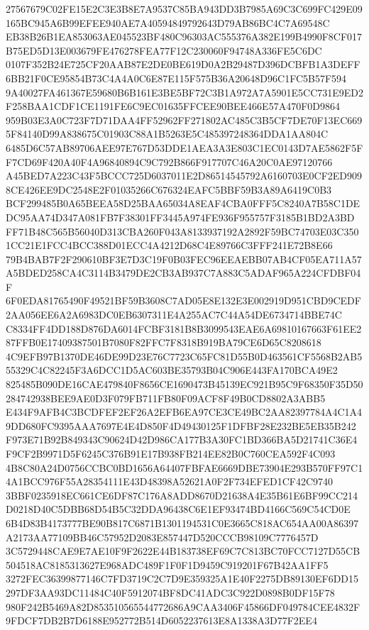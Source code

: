 \documentclass[UTF8,fontset=fandol,zihao=-4,a4paper]{ctexart}
\begin{document}
{{27567679C02FE15E2C3E3B8E7A9537C85BA943DD3B7985A69C3C699FC429E09165BC945A6B99EFEE940AE7A40594849792643D79AB86BC4C7A69548C
EB38B26B1EA853063AE045523BF480C96303AC555376A382E199B4990F8CF017B75ED5D13E003679FE476278FEA77F12C230060F94748A336FE5C6DC
0107F352B24E725CF20AAB87E2DE0BE619D0A2B29487D396DCBFB1A3DEFF6BB21F0CE95854B73C4A4A0C6E87E115F575B36A20648D96C1FC5B57F594
9A40027FA461367E59680B6B161E3BE5BF72C3B1A972A7A5901E5CC731E9ED2F258BAA1CDF1CE1191FE6C9EC01635FFCEE90BEE466E57A470F0D9864
959B03E3A0C723F7D71DAA4FF52962FF271802AC485C3B5CF7DE70F13EC6695F84140D99A838675C01903C88A1B5263E5C485397248364DDA1AA804C
6485D6C57AB89706AEE97E767D53DDE1AEA3A3E803C1EC0143D7AE5862F5FF7CD69F420A40F4A96840894C9C792B866F917707C46A20C0AE97120766
A45BED7A223C43F5BCCC725D6037011E2D86514545792A6160703E0CF2ED9098CE426EE9DC2548E2F01035266C676324EAFC5BBF59B3A89A6419C0B3
BCF299485B0A65BEEA58D25BAA65034A8EAF4CBA0FFF5C8240A7B58C1DEDC95AA74D347A081FB7F38301FF3445A974FE936F955757F3185B1BD2A3BD
FF71B48C565B56040D313CBA260F043A8133937192A2892F59BC74703E03C3501CC21E1FCC4BCC388D01ECC4A4212D68C4E89766C3FFF241E72B8E66
79B4BAB7F2F290610BF3E7D3C19F0B03FEC96EEAEBB07AB4CF05EA711A57A5BDED258CA4C3114B3479DE2CB3AB937C7A883C5ADAF965A224CFDBF04F
6F0EDA81765490F49521BF59B3608C7AD05E8E132E3E002919D951CBD9CEDF2AA056EE6A2A6983DC0EB6307311E4A255AC7C44A54DE6734714BBE74C
C8334FF4DD188D876DA6014FCBF3181B8B3099543EAE6A69810167663F61EE287FFB0E17409387501B7080F82FFC7F8318B919BA79CE6D65C8208618
4C9EFB97B1370DE46DE99D23E76C7723C65FC81D55B0D463561CF5568B2AB555329C4C82245F3A6DCC1D5AC603BE35793B04C906E443FA170BCA49E2
825485B090DE16CAE479840F8656CE1690473B45139EC921B95C9F68350F35D50284742938BEE9AE0D3F079FB711FB80F09ACF8F49B0CD8802A3ABB5
E434F9AFB4C3BCDFEF2EF26A2EFB6EA97CE3CE49BC2AA82397784A4C1A49DD680FC9395AAA7697E4E4D850F4D49430125F1DFBF28E232BE5EB35B242
F973E71B92B849343C90624D42D986CA177B3A30FC1BD366BA5D21741C36E4F9CF2B9971D5F6245C376B91E17B938FB214EE82B0C760CEA592F4C093
4B8C80A24D0756CCBC0BD1656A64407FBFAE6669DBE73904E293B570FF97C14A1BCC976F55A28354111E43D48398A52621A0F2F734EFED1CF42C9740
3BBF0235918EC661CE6DF87C176A8ADD8670D21638A4E35B61E6BF99CC214D0218D40C5DBB68D54B5C32DDA96438C6E1EF93474BD4166C569C54CD0E
6B4D83B4173777BE90B817C6871B1301194531C0E3665C818AC654AA00A86397A2173AA77109BB46C57952D2083E857447D520CCCB98109C7776457D
3C5729448CAE9E7AE10F9F2622E44B183738EF69C7C813BC70FCC7127D55CB504518AC8185313627E968ADC489F1F0F1D9459C919201F67B42AA1FF5
3272FEC36399877146C7FD3719C2C7D9E359325A1E40F2275DB89130EF6DD15297DF3AA93DC11484C40F5912074BF8DC41ADC3C922D0898B0DF15F78
980F242B5469A82D853510565544772686A9CAA3406F45866DF049784CEE4832F9FDCF7DB2B7D6188E952772B514D6052237613E8A1338A3D77F2EE4
}}
\end{document}
